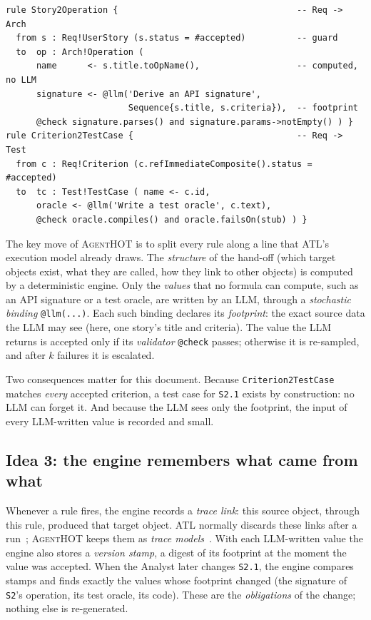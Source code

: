 \documentclass[10pt,a4paper]{article}
\newcommand{\tool}{\textsc{AgentHOT}}
\newcommand{\devteam}{\textsc{DevTeam}}
\newcommand{\code}[1]{\texttt{#1}}
\begin{document}
\begin{lstlisting}[language=ATL, style=model, caption={Two hybrid hand-off rules of \devteam{}. \code{@llm} marks a value an LLM writes; \code{@check} its validator.}, label={lst:rules}]
rule Story2Operation {                                   -- Req -> Arch
  from s : Req!UserStory (s.status = #accepted)          -- guard
  to  op : Arch!Operation (
      name      <- s.title.toOpName(),                   -- computed, no LLM
      signature <- @llm('Derive an API signature',
                        Sequence{s.title, s.criteria}),  -- footprint
      @check signature.parses() and signature.params->notEmpty() ) }
rule Criterion2TestCase {                                -- Req -> Test
  from c : Req!Criterion (c.refImmediateComposite().status = #accepted)
  to  tc : Test!TestCase ( name <- c.id,
      oracle <- @llm('Write a test oracle', c.text),
      @check oracle.compiles() and oracle.failsOn(stub) ) }
\end{lstlisting}

The key move of \tool{} is to split every rule along a line that ATL's
execution model already draws. The \emph{structure} of the hand-off (which
target objects exist, what they are called, how they link to other
objects) is computed by a deterministic engine. Only the \emph{values} that
no formula can compute, such as an API signature or a test oracle, are
written by an LLM, through a \emph{stochastic binding} \code{@llm(...)}.
Each such binding declares its \emph{footprint}: the exact source data the
LLM may see (here, one story's title and criteria). The value the LLM
returns is accepted only if its \emph{validator} \code{@check} passes;
otherwise it is re-sampled, and after $k$ failures it is escalated.

Two consequences matter for this document. Because \code{Criterion2TestCase}
matches \emph{every} accepted criterion, a test case for \code{S2.1}
exists by construction: no LLM can forget it. And because the LLM sees only
the footprint, the input of every LLM-written value is recorded and small.

\subsection{Idea 3: the engine remembers what came from what}

Whenever a rule fires, the engine records a \emph{trace link}: this source
object, through this rule, produced that target object. ATL normally
discards these links after a run~\cite{jouault2005traceability}; \tool{}
keeps them as \emph{trace models}~\cite{vara2014metagem}. With each
LLM-written value the engine also stores a \emph{version stamp}, a digest of
its footprint at the moment the value was accepted. When the Analyst later
changes \code{S2.1}, the engine compares stamps and finds exactly the values
whose footprint changed (the signature of \code{S2}'s operation, its test
oracle, its code). These are the \emph{obligations} of the change; nothing
else is re-generated.
\end{document}
